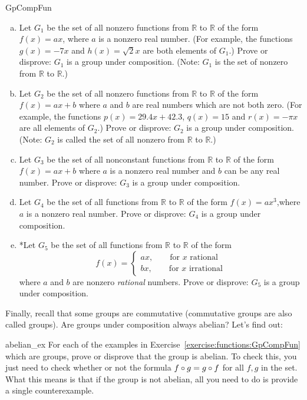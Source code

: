 \begin{exercise}{GpCompFun}
\begin{enumerate}[(a)]
\item
Let $G_1$ be the set of all nonzero functions from $\mathbb{R}$ to $\mathbb{R}$ of the form $f(x)=ax$, where $a$ is a nonzero real number.  (For example, the functions $g(x) = -7x$ and $h(x) = \sqrt{2}x$ are both elements of $G_1$.) Prove or disprove: $G_1$ is a group under composition.
(Note: $G_1$ is the set of nonzero  from $\mathbb{R}$ to $\mathbb{R}$.)
\item
Let $G_2$ be the set of all nonzero functions  from $\mathbb{R}$ to $\mathbb{R}$ of the form $f(x)=ax+b$ where $a$ and $b$ are real numbers which are not both zero.  (For example, the functions $p(x) = 29.4x + 42.3$, $q(x) = 15$ and  $r(x) = -\pi x$ are all elements of $G_2$.)  Prove or disprove: $G_2$ is a group under composition. (Note: $G_2$ is called the set of all  nonzero  from $\mathbb{R}$ to $\mathbb{R}$.)

\item
Let $G_3$ be the set of all  nonconstant  functions from $\mathbb{R}$ to $\mathbb{R}$ of the form $f(x)=ax+b$ where $a$ is a nonzero real number and $b$ can be any real number.  Prove or disprove: $G_3$ is a group under composition.
\item
Let $G_4$ be the set of all functions  from $\mathbb{R}$ to $\mathbb{R}$ of the form $f(x)=ax^3$,where $a$ is a nonzero real number.  Prove or disprove: $G_4$ is a group under composition.
\item
*Let $G_5$ be the set of all functions  from $\mathbb{R}$ to $\mathbb{R}$ of the form 
\[ f(x)= \begin{cases} ax, \qquad \text{for } x \text{ rational}\\ bx, \qquad \text{for } x \text{ irrational}
\end{cases}
\] 
where $a$ and $b$ are nonzero \emph{rational} numbers.  Prove or disprove: $G_5$ is a group under composition.
\end{enumerate}
\end{exercise}

Finally, recall that some groups are commutative (commutative groups are also called  groups). Are groups under composition always abelian? Let's find out:

\begin{exercise}{abelian_ex}
For each of the examples in Exercise~\ref{exercise:functions:GpCompFun} which are groups, prove or disprove that the group is abelian.  To check this, you just need to check whether or not the formula $f \circ g = g \circ f$ for all $f,g$ in the set.  What this means is that if the group is not abelian, all you need to do is provide a single counterexample.
\end{exercise}
  

